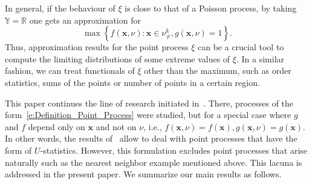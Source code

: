 \documentclass[10pt]{amsart}
\theoremstyle{definition}\newtheorem{defi}[theo]{Definition}\newtheorem{rema}[theo]{Remark}\newtheorem{exam}[theo]{Example}\newtheorem{exem}[theo]{Example}\newtheorem{nota}[theo]{Notation}
\newcommand{\bx}{\mathbf{x}}
\newcommand*\R{\mathbb{R}}
\newcommand*\Y{\mathbb{Y}}
\begin{document}
In general, if the behaviour of $\xi$ is close to that of a Poisson process, by taking $\Y=\R$ one gets an approximation for
\[
\max \left\{f(\bx,\nu): \bx\in\nu^k_{\neq}, g(\bx,\nu)=1\right\}.
\]
Thus, approximation results for the point process $\xi$ can be a crucial tool to compute the limiting distributions of some extreme values of $\xi$. In a similar fashion, we can treat functionals of $\xi$ other than the maximum, such as order statistics, sums of the points or number of points in a certain region.

This paper continues the line of research initiated in~\cite{decreusefond_functional_2016}. There, processes of the form~\eqref{e:Definition_Point_Process} were studied, but for a special case where $g$ and $f$ depend only on $\bx$ and not on $\nu$, i.e., $f(\bx,\nu) = f(\bx), g(\bx,\nu) = g(\bx)$. In other words, the results of~\cite{decreusefond_functional_2016} allow to deal with point processes that have the form of $U$-statistics. However, this formulation excludes point processes that arise naturally such as the nearest neighbor example mentioned above. This lacuna is addressed in the present paper. We summarize our main results as follows.
\end{document}
